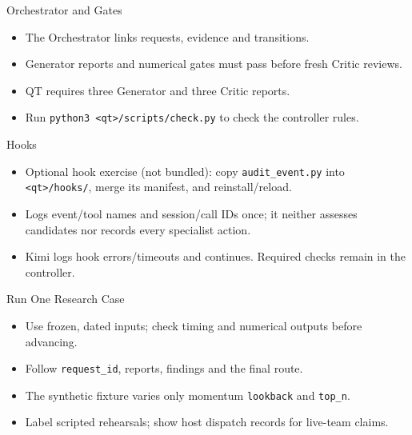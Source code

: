 \begin{frame}{Orchestrator and Gates}

\medskip
\begin{itemize}
\item The Orchestrator links requests, evidence and transitions.
\item Generator reports and numerical gates must pass before fresh Critic reviews.
\item QT requires three Generator and three Critic reports.
\item Run \texttt{python3 <qt>/scripts/check.py} to check the controller rules.
\end{itemize}
\end{frame}

\begin{frame}{Hooks}
\begin{center}

\end{center}
\begin{itemize}
\item Optional hook exercise (not bundled): copy \texttt{audit\_event.py} into \texttt{<qt>/hooks/}, merge its manifest, and reinstall/reload.
\item Logs event/tool names and session/call IDs once; it neither assesses candidates nor records every specialist action.
\item Kimi logs hook errors/timeouts and continues. Required checks remain in the controller.
\end{itemize}
\end{frame}

\begin{frame}{Run One Research Case}
\begin{center}

\end{center}
\begin{itemize}
\item Use frozen, dated inputs; check timing and numerical outputs before advancing.
\item Follow \texttt{request\_id}, reports, findings and the final route.
\item The synthetic fixture varies only momentum \texttt{lookback} and \texttt{top\_n}.
\item Label scripted rehearsals; show host dispatch records for live-team claims.
\end{itemize}
\end{frame}

